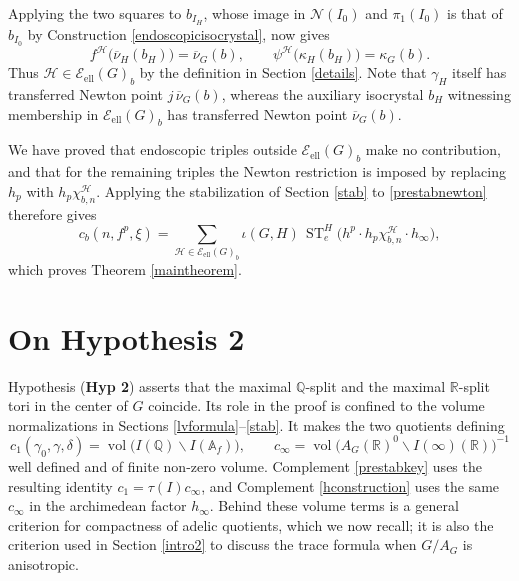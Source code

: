 \documentclass[11pt,a4paper]{article}
\newcommand{\HypTwo}{\textbf{Hyp 2}}
\newcommand{\Eell}{\mathcal{E}_{\mathrm{ell}}}
\theoremstyle{definition}
\theoremstyle{plain}
\theoremstyle{remark}
\theoremstyle{plain}
\DeclareMathOperator{\vol}{vol}
\DeclareMathOperator{\ST}{ST}
\begin{document}
Applying the two squares to $b_{I_H}$, whose image in $\mathcal{N}(I_0)$ and $\pi_1(I_0)$ is that of $b_{I_0}$ by Construction \ref{endoscopicisocrystal}, now gives
$$
    f^{\mathcal H}\bigl(\overline\nu_H(b_H)\bigr)=\overline\nu_G(b),
    \qquad
    \psi^{\mathcal H}\bigl(\kappa_H(b_H)\bigr)=\kappa_G(b).
$$
Thus $\mathcal H\in\Eell(G)_b$ by the definition in Section \ref{details}. Note that $\gamma_H$ itself has transferred Newton point $j\,\overline\nu_G(b)$, whereas the auxiliary isocrystal $b_H$ witnessing membership in $\Eell(G)_b$ has transferred Newton point $\overline\nu_G(b)$.

We have proved that endoscopic triples outside $\Eell(G)_b$ make no contribution, and that for the remaining triples the Newton restriction is imposed by replacing $h_p$ with $h_p\chi_{b,n}^{\mathcal H}$. Applying the stabilization of Section \ref{stab} to \eqref{prestabnewton} therefore gives
$$
    c_b(n,f^p,\xi)
    =\sum_{\mathcal H\in\Eell(G)_b}\iota(G,H)\,
    \ST_e^H\bigl(h^p\cdot h_p\chi_{b,n}^{\mathcal H}\cdot h_\infty\bigr),
$$
which proves Theorem \ref{maintheorem}.

\appendix
\section{On Hypothesis 2}\label{hyp2appendix}

Hypothesis (\HypTwo{}) asserts that the maximal $\mathbb{Q}$-split and the maximal $\mathbb{R}$-split tori in the center of $G$ coincide. Its role in the proof is confined to the volume normalizations in Sections \ref{lvformula}--\ref{stab}. It makes the two quotients defining
$$
    c_1(\gamma_0,\gamma,\delta)
    =\vol\bigl(I(\mathbb{Q})\backslash I(\mathbb{A}_f)\bigr),
    \qquad
    c_{\infty}
    =\vol\bigl(A_G(\mathbb{R})^0\backslash I(\infty)(\mathbb{R})\bigr)^{-1}
$$
well defined and of finite non-zero volume. Complement \ref{prestabkey} uses the resulting identity $c_1=\tau(I)c_{\infty}$, and Complement \ref{hconstruction} uses the same $c_{\infty}$ in the archimedean factor $h_{\infty}$. Behind these volume terms is a general criterion for compactness of adelic quotients, which we now recall; it is also the criterion used in Section \ref{intro2} to discuss the trace formula when $G/A_G$ is anisotropic.
\end{document}
